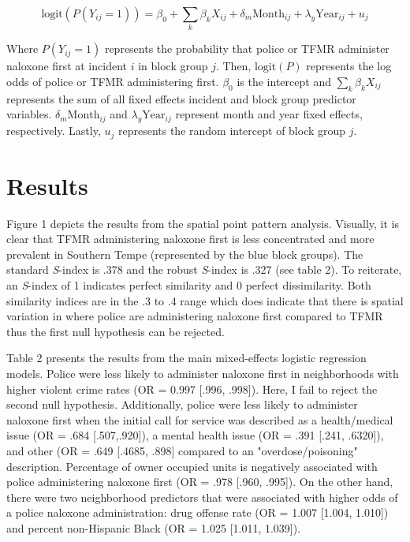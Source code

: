 \[
\text{logit}\left(P(Y_{ij} = 1)\right) = \beta_0 + \sum_{k} \beta_k X_{ij} + \delta_m \text{Month}_{ij} + \lambda_y \text{Year}_{ij} + u_j
\]

\noindent Where \(P(Y_{ij} = 1)\) represents the probability that police or TFMR administer naloxone first at incident \(i\) in block group \(j\). Then, \(\text{logit}(P)\) represents the log odds of police or TFMR administering first. \(\beta_0\) is the intercept and \(\sum_{k} \beta_k X_{ij}\) represents the sum of all fixed effects incident and block group predictor variables. \(\delta_m \text{Month}_{ij}\) and \(\lambda_y \text{Year}_{ij}\) represent month and year fixed effects, respectively. Lastly, \(u_j\) represents the random intercept of block group \(j\).

\section{Results}

Figure 1 depicts the results from the spatial point pattern analysis. Visually, it is clear that TFMR administering naloxone first is less concentrated and more prevalent in Southern Tempe (represented by the blue block groups). The standard \textit{S}-index is .378 and the robust \textit{S}-index is .327 (see table 2). To reiterate, an \textit{S}-index of 1 indicates perfect similarity and 0 perfect dissimilarity. Both similarity indices are in the .3 to .4 range which does indicate that there is spatial variation in where police are administering naloxone first compared to TFMR thus the first null hypothesis can be rejected.

Table 2 presents the results from the main mixed-effects logistic regression models. Police were less likely to administer naloxone first in neighborhoods with higher violent crime rates (OR = 0.997 [.996, .998]). Here, I fail to reject the second null hypothesis. Additionally, police were less likely to administer naloxone first when the initial call for service was described as a health/medical issue (OR = .684 [.507,.920]), a mental health issue (OR = .391 [.241, .6320]), and other (OR = .649 [.4685, .898] compared to an "overdose/poisoning" description. Percentage of owner occupied units is negatively associated with police administering naloxone first (OR = .978 [.960, .995]). On the other hand, there were two neighborhood predictors that were associated with higher odds of a police naloxone administration: drug offense rate (OR = 1.007 [1.004, 1.010]) and percent non-Hispanic Black (OR = 1.025 [1.011, 1.039]).

